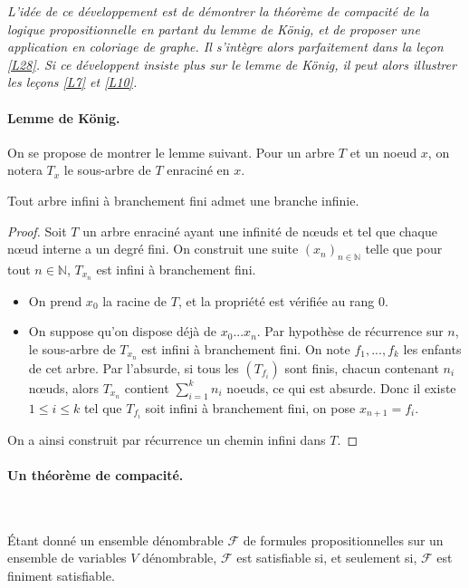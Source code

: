 
\textit{
L'idée de ce développement est de démontrer la théorème de compacité de la logique propositionnelle en partant du lemme de König, et de proposer une application en coloriage de graphe. Il s'intègre alors parfaitement dans la leçon \ref{L28}. Si ce développent insiste plus sur le lemme de König, il peut alors illustrer les leçons \ref{L7} et 
\ref{L10}.
}

\paragraph{Lemme de König.} On se propose de montrer le lemme suivant. Pour un arbre $T$ et un noeud $x$, on notera $T_x$ le sous-arbre de $T$ enraciné en $x$.

\begin{lemma}
Tout arbre infini à branchement fini admet une branche infinie.
\end{lemma}

\begin{proof}
Soit $T$ un arbre enraciné ayant une infinité de nœuds et tel que chaque nœud interne a un degré fini. On construit une suite $(x_n)_{n\in \mathbb{N}}$ telle que pour tout $n\in \mathbb{N}$, $T_{x_n}$ est infini à branchement fini. 
\begin{itemize}
\item On prend $x_0$ la racine de $T$, et la propriété est vérifiée au rang $0$.
\item On suppose qu'on dispose déjà de $x_0...x_n$. Par hypothèse de récurrence sur $n$, le sous-arbre de $T_{x_n}$ est infini à branchement fini. On note $f_1,...,f_k$ les enfants de cet arbre. Par l'absurde, si tous les $(T_{f_i})$ sont finis, chacun contenant $n_i$ nœuds, alors $T_{x_n}$ contient $\sum_{i=1}^k n_i$ noeuds, ce qui est absurde. Donc il existe $1\leq i \leq k$ tel que $T_{f_i}$ soit infini à branchement fini, on pose $x_{n+1} = f_i$. 
\end{itemize}
On a ainsi construit par récurrence un chemin infini dans $T$.
\end{proof}

\paragraph{Un théorème de compacité.}
\begin{theorem}~

Étant donné un ensemble dénombrable $\mathcal{F}$ de formules propositionnelles sur un ensemble de variables $V$ dénombrable, $\mathcal{F}$ est satisfiable si, et seulement si, $\mathcal{F}$ est finiment satisfiable.
\end{theorem}


